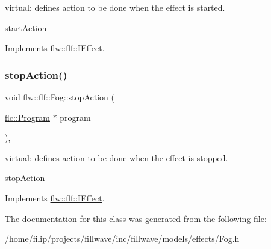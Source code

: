 virtual\+: defines action to be done when the effect is started. 

start\+Action 

Implements \hyperlink{classflw_1_1flf_1_1IEffect_afc7cec9080d135ed264b08a90c7b94e9}{flw\+::flf\+::\+I\+Effect}.

\mbox{\label{classflw_1_1flf_1_1Fog_ab1b33ed568e679c51f24937db7ffd45c}} 
\subsubsection{\texorpdfstring{stop\+Action()}{stopAction()}}
{\footnotesize\ttfamily void flw\+::flf\+::\+Fog\+::stop\+Action (\begin{DoxyParamCaption}\item[{\hyperlink{classflw_1_1flc_1_1Program}{flc\+::\+Program} $\ast$}]{program }\end{DoxyParamCaption})\hspace{0.3cm}{\ttfamily [override]}, {\ttfamily [virtual]}}



virtual\+: defines action to be done when the effect is stopped. 

stop\+Action 

Implements \hyperlink{classflw_1_1flf_1_1IEffect_a1a03eaf63a9d4edbd8764540d2d4133c}{flw\+::flf\+::\+I\+Effect}.



The documentation for this class was generated from the following file\+:\begin{DoxyCompactItemize}
\item 
/home/filip/projects/fillwave/inc/fillwave/models/effects/Fog.\+h\end{DoxyCompactItemize}
